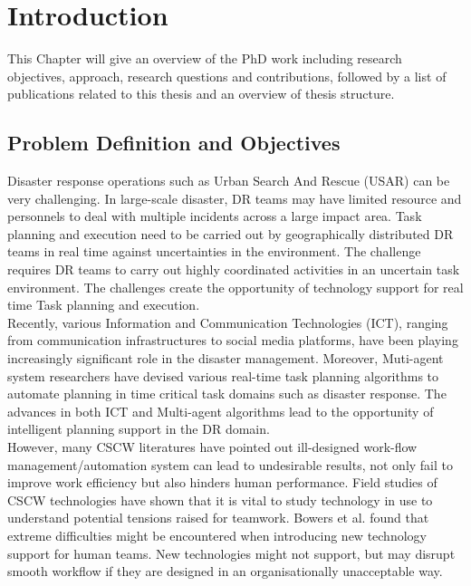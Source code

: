 \chapter{Introduction}\label{ch:introduction}
This Chapter will give an overview of the PhD work including research objectives, approach, research questions and contributions, followed by a list of publications related to this thesis and an overview of thesis structure.


\section{Problem Definition and Objectives}
Disaster response operations such as Urban Search And Rescue (USAR) can be very challenging. In large-scale disaster, DR teams may have limited resource and personnels to deal with multiple incidents across a large impact area. Task planning and execution need to be carried out by geographically distributed DR teams in real time against uncertainties in the environment. The challenge requires DR teams to carry out highly coordinated activities in an uncertain task environment. The challenges create the opportunity of technology support for real time Task planning and execution.  \\ 

Recently, various Information and Communication Technologies (ICT), ranging from communication infrastructures to social media platforms, have been playing increasingly significant role in the disaster management.  Moreover, Muti-agent system researchers have devised various real-time task planning algorithms to automate planning in time critical task domains such as disaster response. The advances in both ICT and Multi-agent algorithms lead to the opportunity of intelligent planning support in the DR domain.\\

However, many CSCW literatures have pointed out ill-designed work-flow management/automation system can lead to undesirable results, not only fail to improve work efficiency but also hinders human performance. Field studies of CSCW technologies have shown that it is vital to study technology in use to understand potential tensions raised for teamwork. Bowers et al. found that extreme difficulties might be encountered when introducing new technology support for human teams. New technologies might not support, but may disrupt smooth workflow if they are designed in an organisationally unacceptable way. \\


